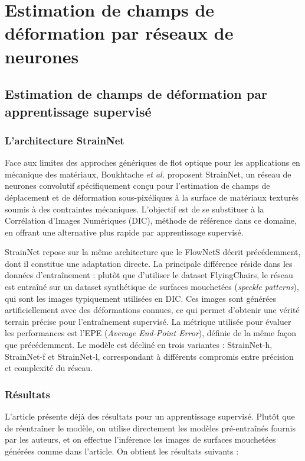 \documentclass{magnolia}
\begin{document}
\section{Estimation de champs de déformation par réseaux de neurones}

\subsection{Estimation de champs de déformation par apprentissage supervisé}
\subsubsection{L'architecture StrainNet}

Face aux limites des approches génériques de flot optique pour les applications en mécanique des matériaux, Boukhtache \textit{et al.} \cite{strainnet} proposent StrainNet, un réseau de neurones convolutif spécifiquement conçu pour l'estimation de champs de déplacement et de déformation sous-pixéliques à la surface de matériaux texturés soumis à des contraintes mécaniques. L'objectif est de se substituer à la Corrélation d'Images Numériques (DIC), méthode de référence dans ce domaine, en offrant une alternative plus rapide par apprentissage supervisé.

StrainNet repose sur la même architecture que le FlowNetS décrit précédemment, dont il constitue une adaptation directe. La principale différence réside dans les données d'entraînement : plutôt que d'utiliser le dataset FlyingChairs, le réseau est entraîné sur un dataset synthétique de surfaces mouchetées (\textit{speckle patterns}), qui sont les images typiquement utilisées en DIC. Ces images sont générées artificiellement avec des déformations connues, ce qui permet d'obtenir une vérité terrain précise pour l'entraînement supervisé. La métrique utilisée pour évaluer les performances est l'EPE (\textit{Average End-Point Error}), définie de la même façon que précédemment. Le modèle est décliné en trois variantes : StrainNet-h, StrainNet-f et StrainNet-l, correspondant à différents compromis entre précision et complexité du réseau.


\subsubsection{Résultats}
L'article \cite{strainnet} présente déjà des résultats pour un apprentissage supervisé.
Plutôt que de réentraîner le modèle, on utilise directement les modèles pré-entraînés 
fournis par les auteurs, et on effectue l'inférence les images de surfaces mouchetées générées comme dans l'article.
On obtient les résultats suivants :
\end{document}
